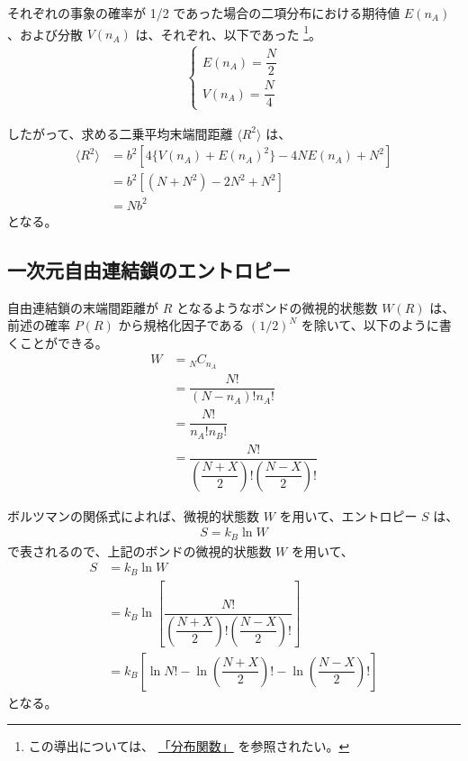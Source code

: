 \documentclass[a4paper,11pt]{ltjsarticle}
\begin{document}
\begin{appendix}
それぞれの事象の確率が 1/2 であった場合の二項分布における期待値 $E(n_A)$、および分散 $V(n_A)$ は、それぞれ、以下であった
\footnote
{
この導出については、
\href{https://dl.dropboxusercontent.com/u/18899343/Probability/Prob_Dist/Prob_Dist.pdf}{「分布関数」}
を参照されたい。
}。
\begin{align*}
\begin{cases}
E(n_A)=\dfrac{N}{2} \\[8pt]
V(n_A)=\dfrac{N}{4}
\end{cases}
\end{align*}

したがって、求める二乗平均末端間距離 $\langle R^2 \rangle$ は、
\begin{align*}
\langle R^2 \rangle 
	&= b^2 \left[ 4 \{V(n_A)+E(n_A)^2\} - 4N E(n_A) + N^2 \right] \\
	&= b^2 [ (N +N^2) - 2N^2 + N^2 ] \\
	&= N b^2
\end{align*}
となる。

\subsection{一次元自由連結鎖のエントロピー}
\label{ssec:1DRW_S}

自由連結鎖の末端間距離が $R$ となるようなボンドの微視的状態数 $W(R)$ は、前述の確率 $P(R)$ から規格化因子である $(1/2)^N$ を除いて、以下のように書くことができる。
\begin{align*}
W 
	&= {}_N C_{n_A} \\
	&= \dfrac{N!}{(N-n_A)! n_A!} \\[8pt]
	&= \dfrac{N!}{n_A! n_B!} \\
	&= \dfrac{N!}{ \left( \dfrac{N + X}{2} \right)! \left( \dfrac{N - X}{2} \right)!}
\end{align*}

ボルツマンの関係式によれば、微視的状態数 $W$ を用いて、エントロピー $S$ は、
\begin{align*}
S=k_B \ln W
\end{align*}
で表されるので、上記のボンドの微視的状態数 $W$ を用いて、
\begin{align*}
S 
	&= k_B \ln W \\
	&= k_B \ln \left[ \dfrac{N!}{ \left( \dfrac{N+X}{2} \right)! \left( \dfrac{N-X}{2} \right)!} \right] \\
	&= k_B \left[ \ln N! -\ln \left( \dfrac{N+X}{2}\right)! -\ln \left( \dfrac{N-X}{2}\right)! \right]
\end{align*}
となる。


\end{appendix}
\end{document}
